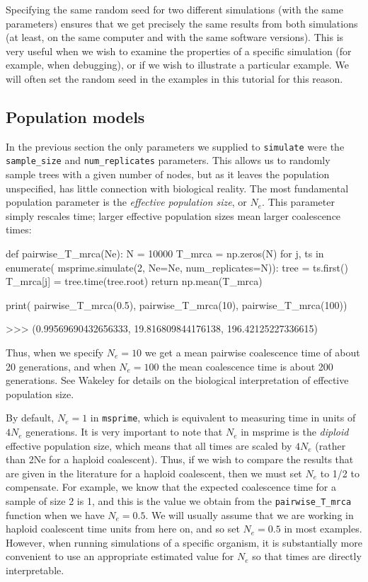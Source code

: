 \documentclass[graybox]{svmult}
\newcommand{\msprime}[0]{\texttt{msprime}}
\begin{document}
Specifying the same random seed for two different simulations (with the
same parameters) ensures that we get precisely the same results from
both simulations (at least, on the same computer and with the same
software versions). This is very useful when we wish to examine the
properties of a specific simulation (for example, when debugging), or if
we wish to illustrate a particular example. We will often set the random
seed in the examples in this tutorial for this reason.

\subsection{Population models}\label{population-models}

In the previous section the only parameters we supplied to
\texttt{simulate} were the \texttt{sample\_size} and
\texttt{num\_replicates} parameters. This allows us to randomly sample
trees with a given number of nodes, but as it leaves the population unspecified, has little connection with
biological reality. The most fundamental population parameter is the \emph{effective population size}, or
\(N_e\). This parameter simply rescales time; larger effective
population sizes mean larger coalescence times:

\begin{pythoncode}
def pairwise_T_mrca(Ne):
    N = 10000
    T_mrca = np.zeros(N)
    for j, ts in enumerate(
            msprime.simulate(2, Ne=Ne, num_replicates=N)):
        tree = ts.first()
        T_mrca[j] = tree.time(tree.root)
    return np.mean(T_mrca)

print(
    pairwise_T_mrca(0.5), pairwise_T_mrca(10),
    pairwise_T_mrca(100))

>>> (0.99569690432656333, 19.816809844176138, 196.42125227336615)
\end{pythoncode}

    Thus, when we specify \(N_e=10\) we get a mean pairwise coalescence time of about
20 generations, and when \(N_e=100\) the mean coalescence time is about
200 generations. See Wakeley \citep{Wakeley2009} for details on the biological interpretation of effective population size.

By default, \(N_e = 1\) in \msprime, which is equivalent to measuring
time in units of \(4N_e\) generations. It is very important to note that
\(N_e\) in msprime is the \emph{diploid} effective population size,
which means that all times are scaled by \(4N_e\) (rather than 2Ne for a
haploid coalescent). Thus, if we wish to compare the results that are
given in the literature for a haploid coalescent, then we must set
\(N_e\) to 1/2 to compensate. For example, we know that the expected
coalescence time for a sample of size 2 is 1, and this is the value we
obtain from the \texttt{pairwise\_T\_mrca} function when we have
\(N_e=0.5\). We will usually assume that we are working in haploid
coalescent time units from here on, and so set \(N_e=0.5\) in most
examples. However, when running simulations of a specific organism, it
is substantially more convenient to use an appropriate estimated value
for \(N_e\) so that times are directly interpretable.
\end{document}
